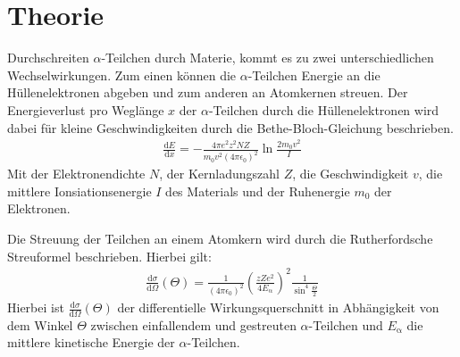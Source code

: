 \section{Theorie}
\label{sec:Theorie}
Durchschreiten $\alpha$-Teilchen durch Materie, kommt es zu zwei unterschiedlichen Wechselwirkungen.
Zum einen können die $\alpha$-Teilchen Energie an die Hüllenelektronen abgeben und zum anderen
an Atomkernen streuen. Der Energieverlust pro Weglänge $x$ der $\alpha$-Teilchen durch die Hüllenelektronen wird dabei für
kleine Geschwindigkeiten durch die
Bethe-Bloch-Gleichung beschrieben.
\begin{align}
  \frac{\mathrm{d}E}{\mathrm{d}x} = - \frac{4\pi e^2 z^2 N Z}{m_{\mathrm{0}}v^2(4 \pi \epsilon_{\mathrm{0}})^2} \ln{\frac{2 m_{\mathrm{0}} v^2}{I}}
\end{align}
Mit der Elektronendichte $N$, der Kernladungszahl $Z$, die Geschwindigkeit $v$, die mittlere Ionsiationsenergie $I$ des Materials
und der Ruhenergie $m_{\mathrm{0}}$ der Elektronen.

Die Streuung der Teilchen an einem Atomkern wird durch die Rutherfordsche Streuformel beschrieben. Hierbei gilt:
\begin{align}
  \frac{\mathrm{d}\sigma}{\mathrm{d}\Omega}(\Theta) = \frac{1}{(4 \pi \epsilon_{\mathrm{0}})^2} \left(\frac{z Z e^2}{4 E_{\mathrm{\alpha}}}\right)^2 \frac{1}{\sin^4{\frac{\Theta}{2}}}
  \label{eqn:rutherford}
\end{align}
Hierbei ist $\frac{\mathrm{d}\sigma}{\mathrm{d}\Omega}(\Theta)$ der differentielle Wirkungsquerschnitt in Abhängigkeit von dem Winkel $\Theta$
zwischen einfallendem und gestreuten $\alpha$-Teilchen und
$E_{\mathrm{\alpha}}$ die mittlere kinetische Energie der $\alpha$-Teilchen.
